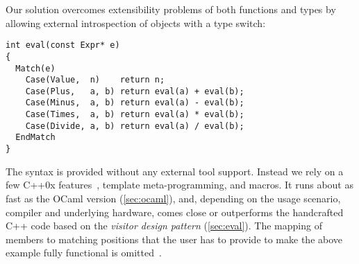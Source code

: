 Our solution overcomes extensibility problems of both functions and 
types by allowing external introspection of objects with a type switch:

\begin{lstlisting}[keepspaces,columns=flexible]
int eval(const Expr* e)
{
  Match(e)
    Case(Value,  n)    return n;
    Case(Plus,   a, b) return eval(a) + eval(b);
    Case(Minus,  a, b) return eval(a) - eval(b);
    Case(Times,  a, b) return eval(a) * eval(b);
    Case(Divide, a, b) return eval(a) / eval(b);
  EndMatch
}
\end{lstlisting}

\noindent
The syntax is provided without any external tool support. Instead we rely on a 
few C++0x features~\cite{C++0x}, template meta-programming, and macros. It runs 
about as fast as the OCaml version (\textsection\ref{sec:ocaml}), and, depending 
on the usage scenario, compiler and underlying hardware, comes close or 
outperforms the handcrafted C++ code based on the \emph{visitor design pattern} 
(\textsection\ref{sec:eval}). The mapping of members to matching positions that 
the user has to provide to make the above example fully functional is 
omitted~\cite[]{TR}.



